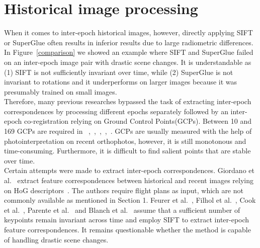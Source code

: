 \section{Historical image processing}
When it comes to inter-epoch historical images, however, directly applying SIFT or SuperGlue often results in inferior results due to large radiometric differences.
In Figure~\ref{comparison} we showed an example where SIFT and SuperGlue failed on an inter-epoch image pair with drastic scene changes. It is understandable as (1) SIFT is not sufficiently invariant over time, while (2) SuperGlue is not invariant to rotations and it underperforms on larger images because it was presumably trained on small images.\\
Therefore, many previous researches bypassed the task of extracting inter-epoch correspondences by processing different epochs separately followed by an inter-epoch co-registration relying on Ground Control Points(GCPs).
Between 10 and 169 GCPs are required in ~\cite{pinto2019archived},~\cite{bozek2019analysis},~\cite{persia2020archival},~\cite{micheletti2015application},~\cite{molg2017structure}.
GCPs are usually measured with the help of photointerpretation on recent orthophotos, however, it is still monotonous and time-consuming. Furthermore, it is difficult to find salient points that are stable over time.\\
Certain attempts were made to extract inter-epoch correspondences. Giordano et al.~\cite{giordano2018toward} extract feature correspondences between historical and recent images relying on HoG descriptors~\cite{dalal2005histograms}. The authors require flight plans as input, which are not commonly available as mentioned in Section 1. Feurer et al.~\cite{feurer2018joining}, Filhol et al.~\cite{filhol2019time}, Cook et al.~\cite{cook2019simple}, Parente et al.~\cite{parente2021automated} and Blanch et al.~\cite{blanch2021multi} assume that a sufficient number of keypoints remain invariant across time and employ SIFT to extract inter-epoch feature correspondences. It remains questionable whether the method is capable of handling drastic scene changes.
